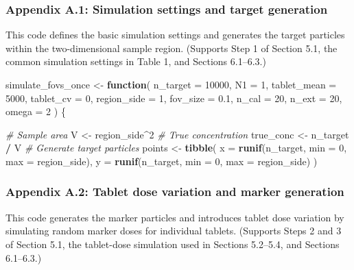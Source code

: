 \documentclass[
  12pt,
]{article}
\newenvironment{Shaded}{\begin{snugshade}}{\end{snugshade}}
\newcommand{\AttributeTok}[1]{\textcolor[rgb]{0.13,0.29,0.53}{#1}}
\newcommand{\CommentTok}[1]{\textcolor[rgb]{0.56,0.35,0.01}{\textit{#1}}}
\newcommand{\ControlFlowTok}[1]{\textcolor[rgb]{0.13,0.29,0.53}{\textbf{#1}}}
\newcommand{\DecValTok}[1]{\textcolor[rgb]{0.00,0.00,0.81}{#1}}
\newcommand{\FloatTok}[1]{\textcolor[rgb]{0.00,0.00,0.81}{#1}}
\newcommand{\FunctionTok}[1]{\textcolor[rgb]{0.13,0.29,0.53}{\textbf{#1}}}
\newcommand{\NormalTok}[1]{#1}
\newcommand{\OtherTok}[1]{\textcolor[rgb]{0.56,0.35,0.01}{#1}}
\newcommand{\SpecialCharTok}[1]{\textcolor[rgb]{0.81,0.36,0.00}{\textbf{#1}}}
\begin{document}
\subsubsection{Appendix A.1: Simulation settings and target
generation}\label{appendix-a.1-simulation-settings-and-target-generation}

This code defines the basic simulation settings and generates the target
particles within the two-dimensional sample region. (Supports Step 1 of
Section 5.1, the common simulation settings in Table 1, and Sections
6.1--6.3.)

\begin{Shaded}
\begin{Highlighting}[]
\NormalTok{simulate\_fovs\_once }\OtherTok{\textless{}{-}} \ControlFlowTok{function}\NormalTok{(}
  \AttributeTok{n\_target =} \DecValTok{10000}\NormalTok{,}
  \AttributeTok{N1 =} \DecValTok{1}\NormalTok{,}
  \AttributeTok{tablet\_mean =} \DecValTok{5000}\NormalTok{,}
  \AttributeTok{tablet\_cv =} \DecValTok{0}\NormalTok{,}
  \AttributeTok{region\_side =} \DecValTok{1}\NormalTok{,}
  \AttributeTok{fov\_size =} \FloatTok{0.1}\NormalTok{,}
  \AttributeTok{n\_cal =} \DecValTok{20}\NormalTok{,}
  \AttributeTok{n\_ext =} \DecValTok{20}\NormalTok{,}
  \AttributeTok{omega =} \DecValTok{2}
\NormalTok{) \{}
  
  \CommentTok{\# Sample area}
\NormalTok{  V }\OtherTok{\textless{}{-}}\NormalTok{ region\_side}\SpecialCharTok{\^{}}\DecValTok{2}
  \CommentTok{\# True concentration}
\NormalTok{  true\_conc }\OtherTok{\textless{}{-}}\NormalTok{ n\_target }\SpecialCharTok{/}\NormalTok{ V}
  \CommentTok{\# Generate target particles}
\NormalTok{  points }\OtherTok{\textless{}{-}} \FunctionTok{tibble}\NormalTok{(}
    \AttributeTok{x =} \FunctionTok{runif}\NormalTok{(n\_target, }\AttributeTok{min =} \DecValTok{0}\NormalTok{, }\AttributeTok{max =}\NormalTok{ region\_side),}
    \AttributeTok{y =} \FunctionTok{runif}\NormalTok{(n\_target, }\AttributeTok{min =} \DecValTok{0}\NormalTok{, }\AttributeTok{max =}\NormalTok{ region\_side)}
\NormalTok{  )}
\end{Highlighting}
\end{Shaded}

\subsubsection{Appendix A.2: Tablet dose variation and marker
generation}\label{appendix-a.2-tablet-dose-variation-and-marker-generation}

This code generates the marker particles and introduces tablet dose
variation by simulating random marker doses for individual tablets.
(Supports Steps 2 and 3 of Section 5.1, the tablet-dose simulation used
in Sections 5.2--5.4, and Sections 6.1--6.3.)
\end{document}
